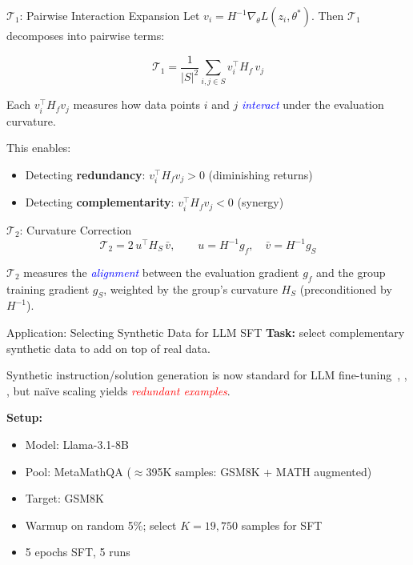 \documentclass[aspectratio=169]{beamer}
\renewcommand{\emph}[1]{\textit{\textcolor{blue}{#1}}}
\newcommand{\remph}[1]{\textit{\textcolor{red}{#1}}}
\begin{document}
\begin{frame}{$\mathcal{T}_1$: Pairwise Interaction Expansion}
    Let $v_i = H^{-1}\nabla_\theta L(z_i, \theta^*)$. Then $\mathcal{T}_1$ decomposes into pairwise terms:

    \begin{equation}
        \mathcal{T}_1 = \frac{1}{|S|^2}\sum_{i,j \in S} v_i^\top H_f \, v_j
    \end{equation}

    \vspace{0.5cm}
    Each $v_i^\top H_f v_j$ measures how data points $i$ and $j$ \emph{interact} under the evaluation curvature.

    \pause
    \vspace{0.5cm}
    This enables:
    \begin{itemize}
        \item Detecting \textbf{redundancy}: $v_i^\top H_f v_j > 0$ (diminishing returns)
        \item Detecting \textbf{complementarity}: $v_i^\top H_f v_j < 0$ (synergy)
    \end{itemize}
\end{frame}

\begin{frame}{$\mathcal{T}_2$: Curvature Correction \citep{basu2020second}}
    $$\mathcal{T}_2 = 2\,u^\top H_S \,\bar{v}, \qquad u = H^{-1}g_f, \quad \bar{v} = H^{-1}g_S$$

    \vspace{0.6cm}
    $\mathcal{T}_2$ measures the \emph{alignment} between the evaluation gradient $g_f$ and the group training gradient $g_S$, weighted by the group's curvature $H_S$ (preconditioned by $H^{-1}$).
\end{frame}


\begin{frame}{Application: Selecting Synthetic Data for LLM SFT}
    \textbf{Task:} select complementary synthetic data to add on top of real data.

    \vspace{0.2cm}
    {\small Synthetic instruction/solution generation is now standard for LLM fine-tuning~\citep{wang2023selfinstruct}, \citep{xu2024wizardlm}, \citep{yu2024metamath}, but na\"ive scaling yields \remph{redundant examples}.}

    \vspace{0.4cm}
    \textbf{Setup:}
    \begin{itemize}
        \item Model: Llama-3.1-8B
        \item Pool: MetaMathQA ($\approx$395K samples: GSM8K + MATH augmented)
        \item Target: GSM8K
        \item Warmup on random 5\%; select $K = 19{,}750$ samples for SFT
        \item 5 epochs SFT, 5 runs
    \end{itemize}
\end{frame}
\end{document}
